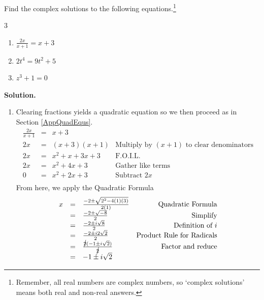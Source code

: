 \documentclass{ximera}
\begin{document}
\begin{example} \label{complexsolnsreviewex}  Find the complex solutions to the following equations.\footnote{Remember, all real numbers are complex numbers, so `complex solutions' means both real and non-real answers.} 

\begin{multicols}{3}
\begin{enumerate}


\item  $\frac{2x}{x+1} = x+3$

\item $2t^4 = 9t^2 + 5$

\item  $z^3 + 1 = 0$

\end{enumerate}
\end{multicols}

{\bf Solution.}

\begin{enumerate}

\enlargethispage{20pt}

\item  Clearing fractions yields a quadratic equation so we then proceed as in Section \ref{AppQuadEqus}.\[ \begin{array}{rclr}


\frac{2x}{x+1} & = &  x+3 & \\
2x & = & (x+3)(x+1) & \text{Multiply by $(x+1)$ to clear denominators} \\

2x & = & x^2 + x + 3x + 3 & \text{F.O.I.L.} \\

2x & = & x^2 + 4x + 3 & \text{Gather like terms} \\

0 & = & x^2 + 2x + 3 & \text{Subtract $2x$} \\

\end{array}\] From here, we apply the Quadratic Formula \[ \begin{array}{rclr}

x  & =  & \frac{-2 \pm \sqrt{2^2 - 4(1)(3)}}{2(1)}  & \text{Quadratic Formula}\\ 
    & = &  \frac{-2 \pm \sqrt{-8}}{2} & \text{Simplify}\\ 
		& =  & \frac{-2 \pm i \sqrt{8}}{2} & \text{Definition of $i$}\\ 
		& =  & \frac{-2 \pm i 2\sqrt{2}}{2} & \text{Product Rule for Radicals}\\ 
		& = & \frac{\cancel{2}(-1 \pm i\sqrt{2})}{\cancel{2}} & \text{Factor and reduce}\\ 
		& = & -1 \pm i \sqrt{2} & \\
		\end{array} \]
		

\end{enumerate}
\end{example}
\end{document}
